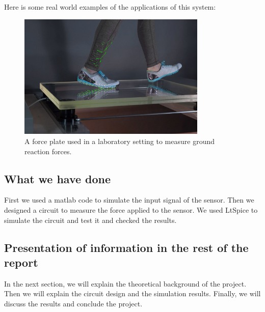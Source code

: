 Here is some real world examples of the applications of this system:
\begin{figure}[H]
    \centering
    \includegraphics[width=0.8\textwidth]{../Report/Figures/1.Introduction/Force-plate.jpg}
    \caption{A force plate used in a laboratory setting to measure ground reaction forces.}
\end{figure}

\subsection{What we have done}
First we used a matlab code to simulate the input signal of the sensor. Then we designed a circuit to measure the force applied to the sensor. We used LtSpice to simulate the circuit and test it and checked the results.

\subsection{Presentation of information in the rest of the report}
In the next section, we will explain the theoretical background of the project. Then we will explain the circuit design and the simulation results. Finally, we will discuss the results and conclude the project.





